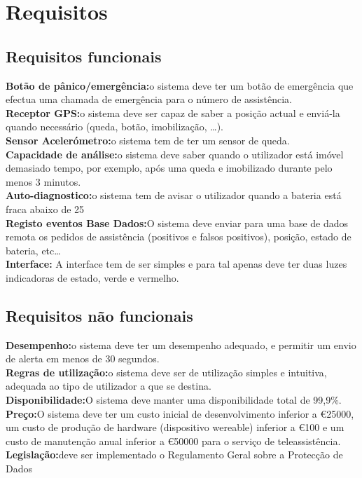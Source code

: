 \section{Requisitos}
\subsection{Requisitos funcionais}
\textbf{Botão de pânico/emergência:}o sistema deve ter um botão de emergência que efectua uma chamada de emergência para o número de assistência.
\\
\textbf{Receptor GPS:}o sistema deve ser capaz de saber a posição actual e enviá-la quando necessário (queda, botão, imobilização, …).
\\
\textbf{Sensor Acelerómetro:}o sistema tem de ter um sensor de queda.
\\
\textbf{Capacidade de análise:}o sistema deve saber quando o utilizador está imóvel demasiado tempo, por exemplo, após uma queda e imobilizado durante pelo menos 3 minutos.
\\
\textbf{Auto-diagnostico:}o sistema tem de avisar o utilizador quando a bateria está fraca abaixo de 25%
\\
\textbf{Registo eventos Base Dados:}O sistema deve enviar para uma base de dados remota os pedidos de assistência (positivos e falsos positivos), posição, estado de bateria, etc…
\\
\textbf{Interface:} A interface tem de ser simples e para tal apenas deve ter duas luzes indicadoras de estado, verde e vermelho.

\subsection{Requisitos não funcionais}
\textbf{Desempenho:}o sistema deve ter um desempenho adequado, e permitir um envio de alerta em menos de 30 segundos.
\\
\textbf{Regras de utilização:}o sistema deve ser de utilização simples e intuitiva, adequada ao tipo de utilizador a que se destina.
\\
\textbf{Disponibilidade:}O sistema deve manter uma disponibilidade total de 99,9\%. 
\\
\textbf{Preço:}O sistema deve ter um custo inicial de desenvolvimento inferior a \euro25000, um custo de produção de hardware (dispositivo wereable) inferior a \euro100 e um custo de manutenção anual inferior a \euro50000 para o serviço de teleassistência.
\\
\textbf{Legislação:}deve ser implementado o Regulamento Geral sobre a Protecção de Dados

